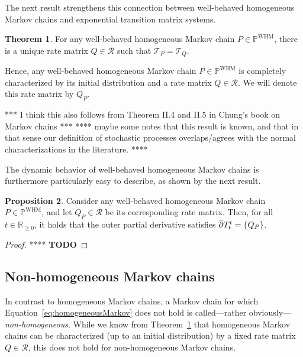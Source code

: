 \documentclass[10pt,a4paper]{paper}
\theoremstyle{definition}
\newtheorem{theorem}{Theorem}
\newtheorem{proposition}[theorem]{Proposition}
\newcommand{\reals}{\mathbb{R}}
\newcommand{\realsnonneg}{\reals_{\geq 0}}
\newcommand{\processes}{\mathbb{P}}
\newcommand{\whmprocesses}{\processes^{\mathrm{WHM}}}
\begin{document}
The next result strengthens this connection between well-behaved homogeneous Markov chains and exponential transition matrix systems.

\begin{theorem}\label{theo:homogeneoushasQ}
For any well-behaved homogeneous Markov chain $P\in\whmprocesses$, there is a unique rate matrix $Q\in\mathcal{R}$ such that $\mathcal{T}_P=\mathcal{T}_Q$.
\end{theorem}

Hence, any well-behaved homogeneous Markov chain $P\in\whmprocesses$ is completely characterized by its initial distribution and a rate matrix $Q\in\mathcal{R}$. We will denote this rate matrix by $Q_P$.

*** I think this also follows from Theorem II.4 and II.5 in Chung's book on Markov chains ***
**** maybe some notes that this result is known, and that in that sense our definition of stochastic processes overlaps/agrees with the normal characterizations in the literature. ****

The dynamic behavior of well-behaved homogeneous Markov chains is furthermore particularly easy to describe, as shown by the next result.
\begin{proposition}\label{prop:Q_is_singleton_deriv_for_homogen}
Consider any well-behaved homogeneous Markov chain $P\in\whmprocesses$, and let $Q_P\in\mathcal{R}$ be its corresponding rate matrix. Then, for all $t\in\realsnonneg$, it holds that the outer partial derivative satisfies $\smash{\overline{\partial}}T_t^t=\{Q_P\}$.
\end{proposition}
\begin{proof}
**** {\bf TODO}
\end{proof}

\subsection{Non-homogeneous Markov chains}\label{sec:nonhomogen_markov}

In contrast to homogeneous Markov chains, a Markov chain for which Equation~\eqref{eq:homogeneousMarkov} does not hold is called---rather obviously---\emph{non-homogeneous}. While we know from Theorem~\ref{theo:homogeneoushasQ} that homogeneous Markov chains can be characterized (up to an initial distribution) by a fixed rate matrix $Q\in\mathcal{R}$, this does not hold for non-homogeneous Markov chains. 
\end{document}
